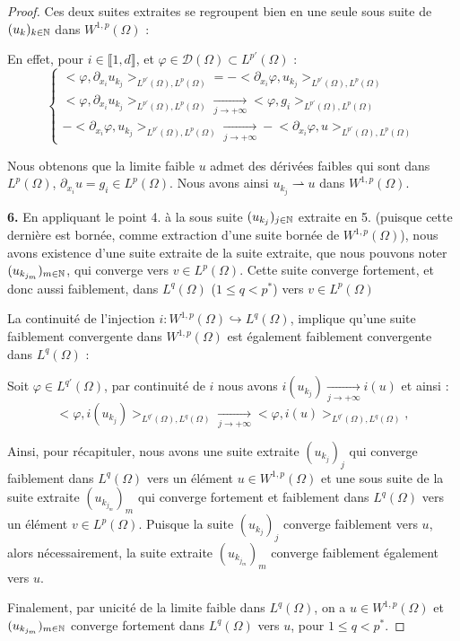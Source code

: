 \begin{proof}
    Ces deux suites extraites se regroupent bien en une seule sous suite de $(u_{k})_{k\in \mathbb{N}}$ dans $W^{1,p}(\Omega)$ :

    En effet, pour $i \in \llbracket 1,d \rrbracket$, et $\varphi \in \mathcal{D}(\Omega) \subset L^{p'}(\Omega)$ :
    $$\begin{cases}
        \big< \varphi, \partial_{x_i} u_{k_j} \big>_{L^{p'}(\Omega),L^p(\Omega)} = - \big<\partial_{x_i}\varphi, u_{k_j} \big>_{L^{p'}(\Omega),L^p(\Omega)} \\
        \big<\varphi, \partial_{x_i} u_{k_j} \big>_{L^{p'}(\Omega),L^p(\Omega)} \xrightarrow[j \to +\infty]{}  \big<\varphi, g_i \big>_{L^{p'}(\Omega),L^p(\Omega)} \\
        - \big<\partial_{x_i}\varphi, u_{k_j} \big>_{L^{p'}(\Omega),L^p(\Omega)} \xrightarrow[j \to +\infty]{} - \big<\partial_{x_i}\varphi,u \big>_{L^{p'}(\Omega),L^p(\Omega)}
    \end{cases}$$

    Nous obtenons que la limite faible $u$ admet des dérivées faibles qui sont dans $L^p(\Omega)$, $\partial_{x_i}u = g_i \in L^p(\Omega)$.
    Nous avons ainsi $u_{k_j} \rightharpoonup u$ dans $W^{1,p}(\Omega)$.

    \vspace{1em}

    \textbf{6.}
    En appliquant le point 4. à la sous suite $(u_{k_j})_{j \in \mathbb{N}}$ extraite en 5. (puisque cette dernière est bornée, comme extraction d'une suite bornée de $W^{1,p}(\Omega)$), nous avons existence d'une suite extraite de la suite extraite, que nous pouvons noter $(u_{k_{j_m}})_{m\in \mathbb{N}}$, qui converge vers $v \in L^p(\Omega)$. 
    Cette suite converge fortement, et donc aussi faiblement, dans $L^q(\Omega)$ ($1 \leq q < p^*$) vers $v \in L^p(\Omega)$

    La continuité de l'injection $i : W^{1,p}(\Omega) \hookrightarrow L^q(\Omega)$, implique qu'une suite faiblement convergente dans $W^{1,p}(\Omega)$ est également faiblement convergente dans $L^q(\Omega)$ :
    
    Soit $\varphi \in L^{q'}(\Omega)$, par continuité de $i$ nous avons $i(u_{k_j}) \xrightarrow[j \to +\infty]{} i(u)$ et ainsi :
    $$ \big< \varphi , i(u_{k_j}) \big>_{L^{q'}(\Omega),L^q(\Omega)} \xrightarrow[j \to +\infty]{} \big<\varphi, i(u) \big>_{L^{q'}(\Omega),L^q(\Omega)}, $$


    \vspace{1em}
    Ainsi, pour récapituler, nous avons une suite extraite $(u_{k_j})_j$ qui converge faiblement dans $L^q(\Omega)$ vers un élément $u \in W^{1,p}(\Omega)$ et une sous suite de la suite extraite $(u_{k_{j_m}})_m$ qui converge fortement et faiblement dans $L^q(\Omega)$ vers un élément $v \in L^p(\Omega)$.
    Puisque la suite $(u_{k_j})_j$ converge faiblement vers $u$, alors nécessairement, la suite extraite $(u_{k_{j_m}})_m$ converge faiblement également vers $u$.
    
    Finalement, par unicité de la limite faible dans $L^q(\Omega)$, on a $u \in W^{1,p}(\Omega)$ et $(u_{k_{j_m}})_{m\in \mathbb{N}}$ converge fortement dans $L^q(\Omega)$ vers $u$, pour $1\leq q < p^*$.

\end{proof}

